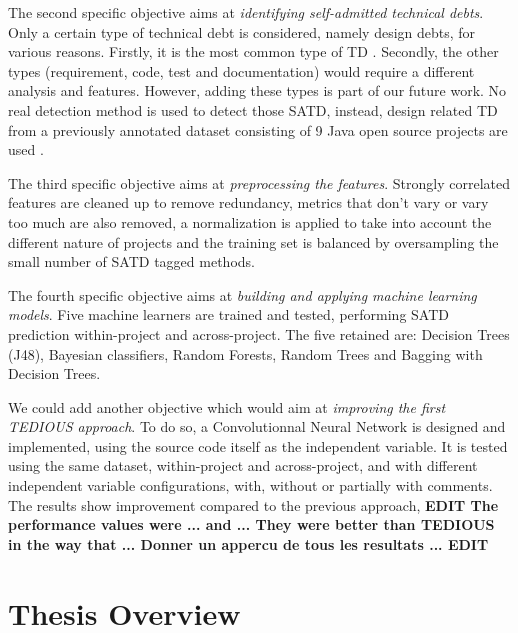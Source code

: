 The second specific objective aims at \emph{identifying self-admitted technical debts}. Only a certain type of technical debt is considered, namely design debts, for various reasons. Firstly, it is the most common type of \ac{TD} \citep{MaldonadoNLP}. Secondly, the other types (requirement, code, test and documentation) would require a different analysis and features. However, adding these types is part of our future work. No real detection method is used to detect those \ac{SATD}, instead, design related \ac{TD} from a previously annotated dataset consisting of 9 Java open source projects are used \citep{MaldonadoNLP}. \par

The third specific objective aims at \emph{preprocessing the features}. Strongly correlated features are cleaned up to remove redundancy, metrics that don't vary or vary too much are also removed, a normalization is applied to take into account the different nature of projects and the training set is balanced by oversampling the small number of \ac{SATD} tagged methods. \par

The fourth specific objective aims at \emph{building and applying machine learning models}. Five machine learners are trained and tested, performing \ac{SATD} prediction within-project and across-project. The five retained are: Decision Trees (J48), Bayesian classifiers, Random Forests, Random Trees and Bagging with Decision Trees. \par

We could add another objective which would aim at \emph{improving the first \ac{TEDIOUS} approach}. To do so, a Convolutionnal Neural Network is designed and implemented, using the source code itself as the independent variable. It is tested using the same dataset, within-project and across-project, and with different independent variable configurations, with, without or partially with comments. The results show improvement compared to the previous approach, \textbf{EDIT The performance values were ... and ... They were better than \ac{TEDIOUS} in the way that ... Donner un appercu de tous les resultats ... EDIT} \par

\section{Thesis Overview}  


